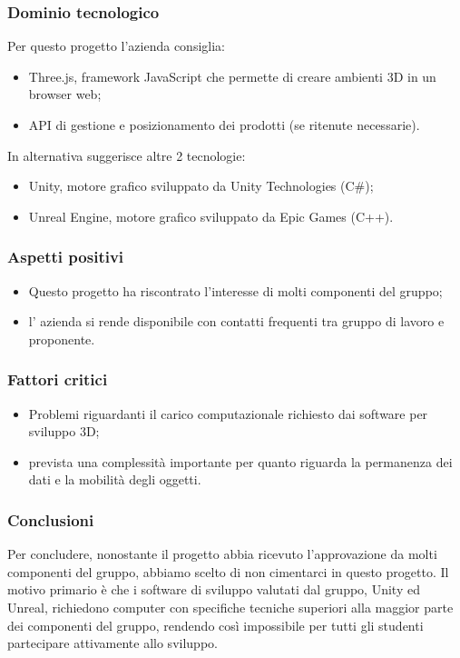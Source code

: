 	\subsubsection{Dominio tecnologico}
		Per questo progetto l’azienda consiglia:
		\begin{itemize}
			\item Three.js, framework JavaScript che permette di creare ambienti 3D in un browser web;
			\item API di gestione e posizionamento dei prodotti (se ritenute necessarie).
		\end{itemize}
		In alternativa suggerisce altre 2 tecnologie:
		\begin{itemize}
			\item Unity, motore grafico sviluppato da Unity Technologies (C\#);
			\item Unreal Engine, motore grafico sviluppato da Epic Games (C++).
		\end{itemize}

	\subsubsection{Aspetti positivi}
		\begin{itemize}
			\item Questo progetto ha riscontrato l’interesse di molti componenti del gruppo;
			\item l’ azienda si rende disponibile con contatti frequenti tra gruppo di lavoro e proponente.
		\end{itemize}		

	\subsubsection{Fattori critici}
		\begin{itemize}
			\item Problemi riguardanti il carico computazionale richiesto dai software per sviluppo 3D;
			\item prevista una complessità importante per quanto riguarda la permanenza dei dati e la mobilità degli oggetti.
		\end{itemize}
	
	\subsubsection{Conclusioni}
		Per concludere, nonostante il progetto abbia ricevuto l’approvazione da molti componenti del gruppo, abbiamo scelto di non cimentarci in questo progetto. Il motivo primario è che i software di sviluppo valutati dal gruppo, Unity ed Unreal, richiedono computer con specifiche tecniche superiori alla maggior parte dei componenti del gruppo, rendendo così impossibile per tutti gli studenti partecipare attivamente allo sviluppo.